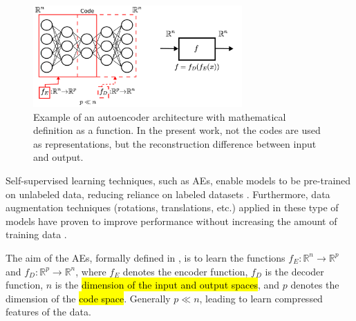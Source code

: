 \documentclass[journal,article,submit,pdftex,moreauthors]{Definitions/mdpi}
\begin{document}
\begin{figure}[H]
	\centering
	\includegraphics[width=8cm]{figures/autoencoder_methodology.pdf}
	 \caption{Example of an autoencoder architecture with mathematical definition as a function. In the present work, not the codes are used as representations, but the reconstruction difference between input and output.}
	\label{AEs_example}      
	\centering
\end{figure}
Self-supervised learning techniques, such as \ac{AEs}, enable models to be pre-trained on unlabeled data, reducing reliance on labeled datasets \cite{Ghanbarzadeh2024}. Furthermore, data augmentation techniques (rotations, translations, etc.) applied in these type of models have proven to improve performance without increasing the amount of training data \cite{Russwurm2018, Zhong2019, Zbontar2021}. 

The aim of the \ac{AEs}, formally defined in \cite{Baldi2012}, is to learn  the functions $f_{E}: \mathbb{R}^{n} \to \mathbb{R}^{p} $ and $f_{D}: \mathbb{R}^{p} \to \mathbb{R}^{n}$, where $f_{E}$ denotes the encoder function, $f_{D}$ is the decoder function, $n$ is the \hl{dimension of the input and output spaces}, and $p$ denotes the dimension of the \hl{code space}.
Generally $p \ll n$, leading to learn compressed features of the data. 

\end{document}
